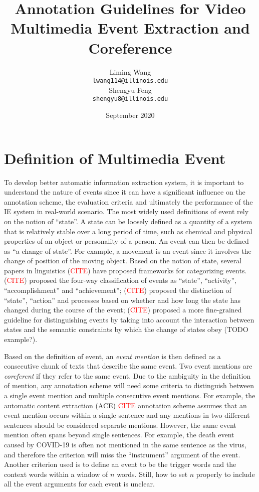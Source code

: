 \documentclass[11pt,a4paper]{article}
\title{Annotation Guidelines for Video Multimedia Event Extraction and Coreference}
\author{Liming Wang\\
\texttt{lwang114@illinois.edu}\\\And
Shengyu Feng\\
\texttt{shengyu8@illinois.edu}\\
}
\date{September 2020}
\begin{document}
\maketitle

\section{Definition of Multimedia Event}
To develop better automatic information extraction system, it is important to understand the nature of events since it can have a significant influence on the  annotation scheme, the evaluation criteria and ultimately the performance of the IE system in real-world scenario. The most widely used definitions of event rely on the notion of ``state''. A state can be loosely defined as a quantity of a system that is relatively stable over a long period of time, such as chemical and physical properties of an object or personality of a person. An event can then be defined as ``a change of state''. For example, a movement is an event since it involves the change of position of the moving object. Based on the notion of state, several papers in linguistics (\textcolor{red}{CITE}) have proposed frameworks for categorizing events. (\textcolor{red}{CITE}) proposed the four-way classification of events as ``state'', ``activity'', ``accomplishment'' and ``achievement''; (\textcolor{red}{CITE}) proposed the distinction of ``state'', ``action'' and processes based on whether and how long the state has changed during the course of the event; (\textcolor{red}{CITE}) proposed a more fine-grained guideline for distinguishing events by taking into account the interaction between states and the semantic constraints by which the change of states obey (TODO example?). 

Based on the definition of event, an \textit{event mention} is then defined as a consecutive chunk of texts that describe the same event. Two event mentions are \textit{coreferent} if they refer to the same event. Due to the ambiguity in the definition of mention, any annotation scheme will need some criteria to distinguish between a single event mention and multiple consecutive event mentions. For example, the automatic content extraction (ACE) \textcolor{red}{CITE} annotation scheme assumes that an event mention occurs within a single sentence and any mentions in two different sentences should be considered separate mentions. However, the same event mention often spans beyond single sentences. For example, the death event caused by COVID-19 is often not mentioned in the same sentence as the virus, and therefore the criterion will miss the ``instrument'' argument  of the event. Another criterion used \cite{Huang2019-argument-compatibility} is to define an event to be the trigger words and the context words within a window of $n$ words. Still, how to set $n$ properly to include all the event arguments for each event is unclear. 
\end{document}
